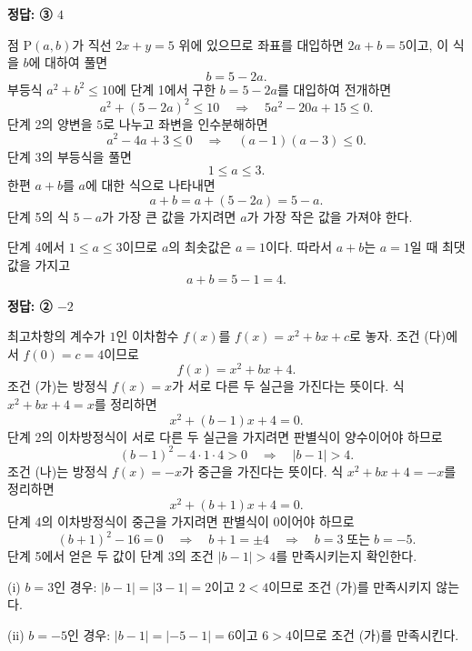 \documentclass[10pt]{article}
\begin{document}
\begin{answerbox}\sffamily\bfseries 정답: ③ $4$\end{answerbox}
 점 $\mathrm{P}(a, b)$가 직선 $2x + y = 5$ 위에 있으므로 좌표를 대입하면 $2a + b = 5$이고, 이 식을 $b$에 대하여 풀면
\[ b = 5 - 2a. \]
 부등식 $a^2 + b^2 \le 10$에 단계 1에서 구한 $b = 5 - 2a$를 대입하여 전개하면
\[ a^2 + (5 - 2a)^2 \le 10 \quad \Longrightarrow \quad 5a^2 - 20a + 15 \le 0. \]
 단계 2의 양변을 $5$로 나누고 좌변을 인수분해하면
\[ a^2 - 4a + 3 \le 0 \quad \Longrightarrow \quad (a - 1)(a - 3) \le 0. \]
 단계 3의 부등식을 풀면
\[ 1 \le a \le 3. \]
 한편 $a + b$를 $a$에 대한 식으로 나타내면
\[ a + b = a + (5 - 2a) = 5 - a. \]
 단계 5의 식 $5 - a$가 가장 큰 값을 가지려면 $a$가 가장 작은 값을 가져야 한다.

단계 4에서 $1 \le a \le 3$이므로 $a$의 최솟값은 $a = 1$이다. 따라서 $a + b$는 $a = 1$일 때 최댓값을 가지고
\[ a + b = 5 - 1 = 4. \]

\begin{answerbox}\sffamily\bfseries 정답: ② $-2$\end{answerbox}
 최고차항의 계수가 $1$인 이차함수 $f(x)$를 $f(x) = x^2 + bx + c$로 놓자. 조건 (다)에서 $f(0) = c = 4$이므로
\[ f(x) = x^2 + bx + 4. \]
 조건 (가)는 방정식 $f(x) = x$가 서로 다른 두 실근을 가진다는 뜻이다. 식 $x^2 + bx + 4 = x$를 정리하면
\[ x^2 + (b - 1)x + 4 = 0. \]
 단계 2의 이차방정식이 서로 다른 두 실근을 가지려면 판별식이 양수이어야 하므로
\[ (b - 1)^2 - 4 \cdot 1 \cdot 4 > 0 \quad \Longrightarrow \quad |b - 1| > 4. \]
 조건 (나)는 방정식 $f(x) = -x$가 중근을 가진다는 뜻이다. 식 $x^2 + bx + 4 = -x$를 정리하면
\[ x^2 + (b + 1)x + 4 = 0. \]
 단계 4의 이차방정식이 중근을 가지려면 판별식이 $0$이어야 하므로
\[ (b + 1)^2 - 16 = 0 \quad \Longrightarrow \quad b + 1 = \pm 4 \quad \Longrightarrow \quad b = 3 \;\text{또는}\; b = -5. \]
 단계 5에서 얻은 두 값이 단계 3의 조건 $|b - 1| > 4$를 만족시키는지 확인한다.

(i) $b = 3$인 경우: $|b - 1| = |3 - 1| = 2$이고 $2 < 4$이므로 조건 (가)를 만족시키지 않는다.

(ii) $b = -5$인 경우: $|b - 1| = |-5 - 1| = 6$이고 $6 > 4$이므로 조건 (가)를 만족시킨다.
\end{document}
